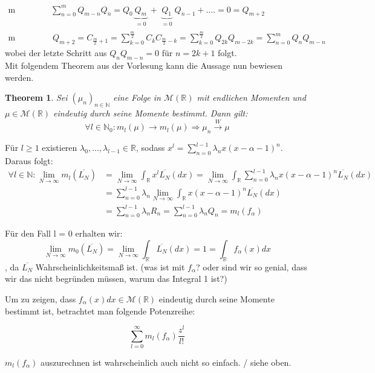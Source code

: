 \documentclass[a4paper, 11pt]{scrreprt}
\newtheorem{theorem}[defi]{Theorem}
\newcommand{\RR}{\mathbb{R}}
\newcommand{\NN}{\mathbb{N}}
\begin{document}
\begin{align*}
\text{m ungerade:}& \sum_{n=0}^m Q_{m-n}Q_n= Q_0 \underbrace{Q_m}_{\substack{=0}} + \underbrace{Q_1}_{\substack{=0}}Q_{n-1}+....= 0=Q_{m+2}\\
\text {m gerade:}&~ Q_{m+2}= C_{\frac{m}{2}+1}= \sum_{k=0}^{\frac{m}{2}} C_k C_{\frac{m}{2}-k}=\sum_{k=0}^{\frac{m}{2}} Q_{2k}Q_{m-2k}=\sum_{n=0}^{m}Q_n Q_{m-n}
\end{align*}
wobei der letzte Schritt aus $ Q_n Q_{m-n}=0 $ für $ n=2k+1 $ folgt.\\

Mit folgendem Theorem aus der Vorlesung kann die Aussage nun bewiesen werden.

\begin{theorem}
Sei \((\mu_n)_{n \in \NN}\) eine Folge in $\mathcal{M}(\RR)$ mit endlichen Momenten und $\mu \in \mathcal{M}(\RR)$ eindeutig durch seine Momente bestimmt. Dann gilt:
\[\forall l \in \NN_0: m_l(\mu) \rightarrow m_l(\mu) \Rightarrow \mu_n \overset{W}{\rightarrow} \mu\]
\end{theorem}

Für $l \geq 1$ existieren $\lambda_0,...,\lambda_{l-1} \in \RR$, sodass $x^l = \sum_{n=0}^{l-1} \lambda_n x (x-\alpha-1)^n$. Daraus folgt:
\begin{align*}
\forall l \in \NN: \lim_{N \to \infty} m_l(\overline{L_{N}}) 
&= \lim_{N \to \infty} \int_\RR x^l \overline{L_{N}}(dx)
= \lim_{N \to \infty} \int_\RR \sum_{n=0}^{l-1} \lambda_n x (x-\alpha-1)^n \overline{L_{N}}(dx) \\
&= \sum_{n=0}^{l-1} \lambda_n \lim_{N \to \infty} \int_\RR x (x-\alpha-1)^n \overline{L_{N}}(dx) \\
&= \sum_{n=0}^{l-1} \lambda_n R_n
= \sum_{n=0}^{l-1} \lambda_n Q_n = m_l(f_\alpha)
\end{align*}

Für den Fall l = 0 erhalten wir:
\[\lim_{N \to \infty} m_0(\overline{L_{N}}) 
= \lim_{N \to \infty} \int_\RR \overline{L_{N}}(dx) = 1 
= \int_\RR f_\alpha(x)dx\]
, da $ \overline{L_N} $ Wahrscheinlichkeitsmaß ist. (was ist mit $ f_{\alpha} $? oder sind wir so genial, dass wir das nicht begründen müssen, warum das Integral 1 ist?)

Um zu zeigen, dass $f_\alpha(x)dx \in \mathcal{M}(\RR)$ eindeutig durch seine Momente bestimmt ist, betrachtet man folgende Potenzreihe:

\[\sum_{l=0}^\infty m_l(f_\alpha) \frac{z^l}{l!}\]

$m_l(f_\alpha)$ auszurechnen ist wahrscheinlich auch nicht so einfach. / siehe oben. 
\end{document}
